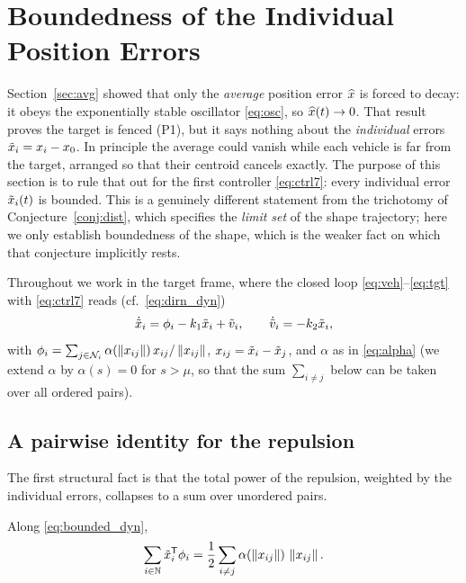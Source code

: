 \section{Boundedness of the Individual Position Errors}
\label{sec:bounded}

Section~\ref{sec:avg} showed that only the \emph{average} position error $\widehat{x}$ is forced to decay:
it obeys the exponentially stable oscillator \eqref{eq:osc}, so $\widehat{x}(t)\to0$. That result proves the
target is fenced (P1), but it says nothing about the \emph{individual} errors
$\tilde{x}_i=x_i-x_0$. In principle the average could vanish while each vehicle is far from the target,
arranged so that their centroid cancels exactly. The purpose of this section is to rule that out for
the first controller \eqref{eq:ctrl7}: every individual error $\tilde{x}_i(t)$ is bounded. This is a
genuinely different statement from the trichotomy of Conjecture~\ref{conj:dist}, which specifies the
\emph{limit set} of the shape trajectory; here we only establish boundedness of the shape, which is
the weaker fact on which that conjecture implicitly rests.

Throughout we work in the target frame, where the closed loop \eqref{eq:veh}--\eqref{eq:tgt} with
\eqref{eq:ctrl7} reads (cf.\ \eqref{eq:dirn_dyn})
\begin{equation}
  \dot{\tilde{x}}_i=\phi_i-k_1\tilde{x}_i+\tilde{v}_i,\qquad
  \dot{\tilde{v}}_i=-k_2\tilde{x}_i,
  \label{eq:bounded_dyn}
\end{equation}
with $\phi_i=\sum_{j\in\mathcal{N}_i}\alpha(\left\| x_{ij} \right\|)\,x_{ij}/\left\| x_{ij} \right\|$, $x_{ij}=\tilde{x}_i-\tilde{x}_j$,
and $\alpha$ as in \eqref{eq:alpha} (we extend $\alpha$ by $\alpha(s)=0$ for $s>\mu$, so that the sum
$\sum_{i\ne j}$ below can be taken over all ordered pairs).

\subsection{A pairwise identity for the repulsion}
\label{sec:pairid}

The first structural fact is that the total power of the repulsion, weighted by the individual errors,
collapses to a sum over unordered pairs.

\begin{lemma}\label{lem:pairid}
Along \eqref{eq:bounded_dyn},
\begin{equation}
  \sum_{i\in\mathbb{N}}\tilde{x}_i^{\mathsf T}\phi_i
  =\frac12\sum_{i\ne j}\alpha(\left\| x_{ij} \right\|)\,\left\| x_{ij} \right\| .
  \label{eq:pairid}
\end{equation}
\end{lemma}

